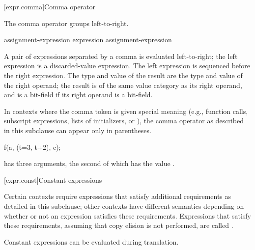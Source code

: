 [expr.comma]{Comma operator}%
%
%
%
%
%

\pnum
The comma operator groups left-to-right.

\begin{bnf}
\br
    assignment-expression\br
    expression \terminal{,} assignment-expression
\end{bnf}

A pair of expressions separated by a comma is evaluated left-to-right;
the left expression is
a discarded-value expression.
The left expression is sequenced before
the right expression.
%
The type and value of the
result are the type and value of the right operand; the result is of the same
value category as its right operand, and is a bit-field if its
right operand is a bit-field.

\pnum
\begin{note}
In contexts where the comma token is given special meaning
(e.g., function calls,
subscript expressions,
lists of initializers,
or ),
the comma operator as described in this subclause can appear only in parentheses.
\begin{example}
\begin{codeblock}
f(a, (t=3, t+2), c);
\end{codeblock}
has three arguments, the second of which has the value
.
\end{example}
\end{note}

[expr.const]{Constant expressions}%

\pnum
Certain contexts require expressions that satisfy additional
requirements as detailed in this subclause; other contexts have different
semantics depending on whether or not an expression satisfies these requirements.
Expressions that satisfy these requirements,
assuming that copy elision is not performed,
are called
%
.
\begin{note}
Constant expressions can be evaluated
during translation.
\end{note}

